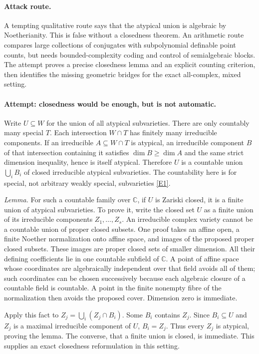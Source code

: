 \documentclass[11pt,a4paper]{article}
\numberwithin{equation}{section}
\newcommand{\C}{\mathbb{C}}
\newcommand{\eref}[2]{\hyperlink{extra:#1:#2}{[E#2]}}
\begin{document}
\paragraph{Attack route.}
A tempting qualitative route says that the atypical union is algebraic by
Noetherianity. This is false without a closedness theorem. An arithmetic
route compares large collections of conjugates with subpolynomial definable
point counts, but needs bounded-complexity coding and control of
semialgebraic blocks. The attempt proves a precise closedness lemma and
an explicit counting criterion, then identifies the missing geometric
bridges for the exact all-complex, mixed setting.

\paragraph{Attempt: closedness would be enough, but is not automatic.}
Write $U\subseteq W$ for the union of all atypical subvarieties.
There are only countably many special $T$. Each intersection $W\cap T$
has finitely many irreducible components. If an irreducible
$A\subseteq W\cap T$ is atypical, an irreducible component $B$ of that
intersection containing it satisfies $\dim B\geq\dim A$ and the same
strict dimension inequality, hence is itself atypical. Therefore $U$ is
a countable union $\bigcup_i B_i$ of closed irreducible atypical subvarieties.
The countability here is for special, not arbitrary weakly special,
subvarieties \eref{statement}{1}.

\emph{Lemma.} For such a countable family over $\C$, if $U$ is Zariski
closed, it is a finite union of atypical subvarieties.
To prove it, write the closed set $U$ as a finite union of its irreducible
components $Z_1,\ldots,Z_s$. An irreducible complex variety cannot be a
countable union of proper closed subsets. One proof takes an affine open,
a finite Noether normalization onto affine space, and images of the proposed
proper closed subsets. These images are proper closed sets of smaller
dimension. All their defining coefficients lie in one countable subfield
of $\C$. A point of affine space whose coordinates are algebraically
independent over that field avoids all of them; such coordinates can be
chosen successively because each algebraic closure of a countable field
is countable. A point in the finite nonempty fibre of the normalization
then avoids the proposed cover. Dimension zero is immediate.

Apply this fact to
$Z_j=\bigcup_i(Z_j\cap B_i)$. Some $B_i$ contains $Z_j$. Since
$B_i\subseteq U$ and $Z_j$ is a maximal irreducible component of $U$,
$B_i=Z_j$. Thus every $Z_j$ is atypical, proving the lemma. The converse,
that a finite union is closed, is immediate. This supplies an exact
closedness reformulation in this setting.
\end{document}
